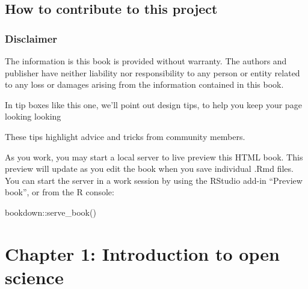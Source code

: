 \documentclass[
]{book}
\newenvironment{Shaded}{\begin{snugshade}}{\end{snugshade}}
\newcommand{\FunctionTok}[1]{\textcolor[rgb]{0.00,0.00,0.00}{#1}}
\newcommand{\NormalTok}[1]{#1}
\newcommand{\SpecialCharTok}[1]{\textcolor[rgb]{0.00,0.00,0.00}{#1}}
\theoremstyle{definition}
\theoremstyle{definition}
\theoremstyle{definition}
\theoremstyle{definition}
\theoremstyle{remark}
\begin{document}
\hypertarget{how-to-contribute-to-this-project}{%
\section*{How to contribute to this project}\label{how-to-contribute-to-this-project}}

\hypertarget{disclaimer}{%
\subsection*{Disclaimer}\label{disclaimer}}

The information is this book is provided without warranty. The authors and publisher have neither liability nor responsibility to any person or entity related to any loss or damages arising from the information contained in this book.

In tip boxes like this one, we'll point out design tips, to help you keep your page looking looking

These tips highlight advice and tricks from community members.

As you work, you may start a local server to live preview this HTML book. This preview will update as you edit the book when you save individual .Rmd files. You can start the server in a work session by using the RStudio add-in ``Preview book'', or from the R console:

\begin{Shaded}
\begin{Highlighting}[]
\NormalTok{bookdown}\SpecialCharTok{::}\FunctionTok{serve\_book}\NormalTok{()}
\end{Highlighting}
\end{Shaded}

\hypertarget{chapter-1-introduction-to-open-science}{%
\chapter{Chapter 1: Introduction to open science}\label{chapter-1-introduction-to-open-science}}
\end{document}
